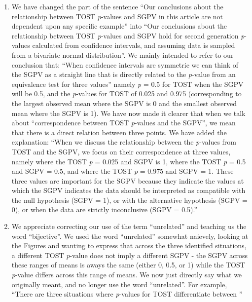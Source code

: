 \documentclass[man]{apa6}
\begin{document}
\begin{enumerate}
\def\labelenumi{\arabic{enumi}.}
\item
  We have changed the part of the sentence \enquote{Our conclusions
  about the relationship between TOST \emph{p}-values and SGPV in this
  article are not dependent upon any specific example} into \enquote{Our
  conclusions about the relationship between TOST \emph{p}-values and
  SGPV hold for second generation \emph{p}-values calculated from
  confidence intervals, and assuming data is sampled from a bivariate
  normal distribution}. We mainly intended to refer to our conclusion
  that: \enquote{When confidence intervals are symmetric we can think of
  the SGPV as a straight line that is directly related to the
  \emph{p}-value from an equivalence test for three values} namely
  \emph{p} = 0.5 for TOST when the SGPV will be 0.5, and the
  \emph{p}-values for TOST of 0.025 and 0.975 (corresponding to the
  largest observed mean where the SGPV is 0 and the smallest observed
  mean where the SGPV is 1). We have now made it clearer that when we
  talk about \enquote{correspondence between TOST \emph{p}-values and
  the SGPV}, we mean that there is a direct relation between three
  points. We have added the explanation: \enquote{When we discuss the
  relationship between the \emph{p}-values from TOST and the SGPV, we
  focus on their correspondence at three values, namely where the TOST
  \emph{p} = 0.025 and SGPV is 1, where the TOST \emph{p} = 0.5 and SGPV
  = 0.5, and where the TOST \emph{p} = 0.975 and SGPV = 1. These three
  values are important for the SGPV because they indicate the values at
  which the SGPV indicates the data should be interpreted as compatible
  with the null hypothesis (SGPV = 1), or with the alternative
  hypothesis (SGPV = 0), or when the data are strictly inconclusive
  (SGPV = 0.5).}
\item
  We appreciate correcting our use of the term \enquote{unrelated} and
  teaching us the word \enquote{bijective}. We used the word
  \enquote{unrelated} somewhat naievely, looking at the Figures and
  wanting to express that across the three identified situations, a
  different TOST \emph{p}-value does not imply a different SGPV - the
  SGPV across these ranges of means is aways the same (either 0, 0.5, or
  1) while the TOST \emph{p}-value differs across this range of means.
  We now just directly say what we originally meant, and no longer use
  the word \enquote{unrelated}. For example, \enquote{There are three
  situations where \emph{p}-values for TOST differentiate between
}
\end{enumerate}
\end{document}
